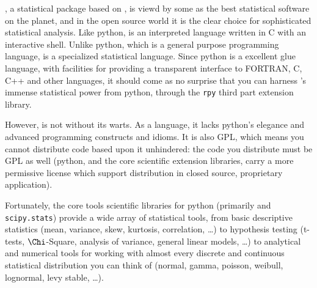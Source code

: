 , a statistical package based on , is viewd by some
as the best statistical software on the planet, and in the open source
world it is the clear choice for sophisticated statistical analysis.
Like python,  is an interpreted language written in C with an
interactive shell.  Unlike python, which is a general purpose
programming language,  is a specialized statistical language.
Since python is a excellent glue language, with facilities for
providing a transparent interface to FORTRAN, C, C++ and other
languages, it should come as no surprise that you can harness
's immense statistical power from python, through the
\texttt{rpy} third part extension library.

However,  is not without its warts.  As a language, it lacks
python's elegance and advanced programming constructs and idioms.  It
is also GPL, which means you cannot distribute code based upon it
unhindered: the code you distribute must be GPL as well (python, and
the core scientific extension libraries, carry a more permissive
license which support distribution in closed source, proprietary
application).

Fortunately, the core tools scientific libraries for python (primarily
 and \texttt{scipy.stats}) provide a wide array of
statistical tools, from basic descriptive statistics (mean, variance,
skew, kurtosis, correlation, \dots) to hypothesis testing (t-tests,
$\Chi$-Square, analysis of variance, general linear models, \dots) to
analytical and numerical tools for working with almost every discrete
and continuous statistical distribution you can think of (normal,
gamma, poisson, weibull, lognormal, levy stable, \dots).



